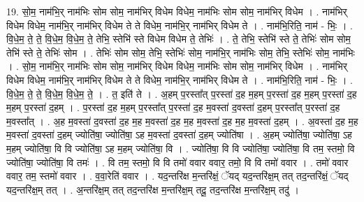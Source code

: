 \documentclass[17pt]{extarticle}
\begin{document}
19. सो॒म॒ नाम॑भि॒र् नाम॑भिः सोम सोम॒ नाम॑भिर् विधेम विधेम॒ नाम॑भिः सोम सोम॒ नाम॑भिर् विधेम । . नाम॑भिर् विधेम विधेम॒ नाम॑भि॒र् नाम॑भिर् विधेम ते ते विधेम॒ नाम॑भि॒र् नाम॑भिर् विधेम ते । . नाम॑भि॒रिति॒ नाम॑ - भिः॒ । . वि॒धे॒म॒ ते॒ ते॒ वि॒धे॒म॒ वि॒धे॒म॒ ते॒ तेभि॒ स्तेभि॑ स्ते विधेम विधेम ते॒ तेभिः॑ । . ते॒ तेभि॒ स्तेभि॑ स्ते ते॒ तेभिः॑ सोम सोम॒ तेभि॑ स्ते ते॒ तेभिः॑ सोम । . तेभिः॑ सोम सोम॒ तेभि॒ स्तेभिः॑ सोम॒ नाम॑भि॒र् नाम॑भिः सोम॒ तेभि॒ स्तेभिः॑ सोम॒ नाम॑भिः । . सो॒म॒ नाम॑भि॒र् नाम॑भिः सोम सोम॒ नाम॑भिर् विधेम विधेम॒ नाम॑भिः सोम सोम॒ नाम॑भिर् विधेम । . नाम॑भिर् विधेम विधेम॒ नाम॑भि॒र् नाम॑भिर् विधेम ते ते विधेम॒ नाम॑भि॒र् नाम॑भिर् विधेम ते । . नाम॑भि॒रिति॒ नाम॑ - भिः॒ । . वि॒धे॒म॒ ते॒ ते॒ वि॒धे॒म॒ वि॒धे॒म॒ ते॒ । . त॒ इति॑ ते । . अ॒हम् प॒रस्ता᳚त् प॒रस्ता॑ द॒ह म॒हम् प॒रस्ता॑ द॒ह म॒हम् प॒रस्ता॑ द॒ह म॒हम् प॒रस्ता॑ द॒हम् । . प॒रस्ता॑ द॒ह म॒हम् प॒रस्ता᳚त् प॒रस्ता॑ द॒ह म॒वस्ता॑ द॒वस्ता॑ द॒हम् प॒रस्ता᳚त् प॒रस्ता॑ द॒ह म॒वस्ता᳚त् । . अ॒ह म॒वस्ता॑ द॒वस्ता॑ द॒ह म॒ह म॒वस्ता॑ द॒ह म॒ह म॒वस्ता॑ द॒ह म॒ह म॒वस्ता॑ द॒हम् । . अ॒वस्ता॑ द॒ह म॒ह म॒वस्ता॑ द॒वस्ता॑ द॒हम् ज्योति॑षा॒ ज्योति॑षा॒ ऽह म॒वस्ता॑ द॒वस्ता॑ द॒हम् ज्योति॑षा । . अ॒हम् ज्योति॑षा॒ ज्योति॑षा॒ ऽह म॒हम् ज्योति॑षा॒ वि वि ज्योति॑षा॒ ऽह म॒हम् ज्योति॑षा॒ वि । . ज्योति॑षा॒ वि वि ज्योति॑षा॒ ज्योति॑षा॒ वि तम॒ स्तमो॒ वि ज्योति॑षा॒ ज्योति॑षा॒ वि तमः॑ । . वि तम॒ स्तमो॒ वि वि तमो॑ ववार ववार॒ तमो॒ वि वि तमो॑ ववार । . तमो॑ ववार ववार॒ तम॒ स्तमो॑ ववार । . व॒वा॒रेति॑ ववार । . यद॒न्तरि॑क्ष म॒न्तरि॑क्षं॒ ॅयद् यद॒न्तरि॑क्ष॒म् तत् तद॒न्तरि॑क्षं॒ ॅयद् यद॒न्तरि॑क्ष॒म् तत् । . अ॒न्तरि॑क्ष॒म् तत् तद॒न्तरि॑क्ष म॒न्तरि॑क्ष॒म् तदू॒ तद॒न्तरि॑क्ष म॒न्तरि॑क्ष॒म् तदु॑ । \newline
\end{document}
